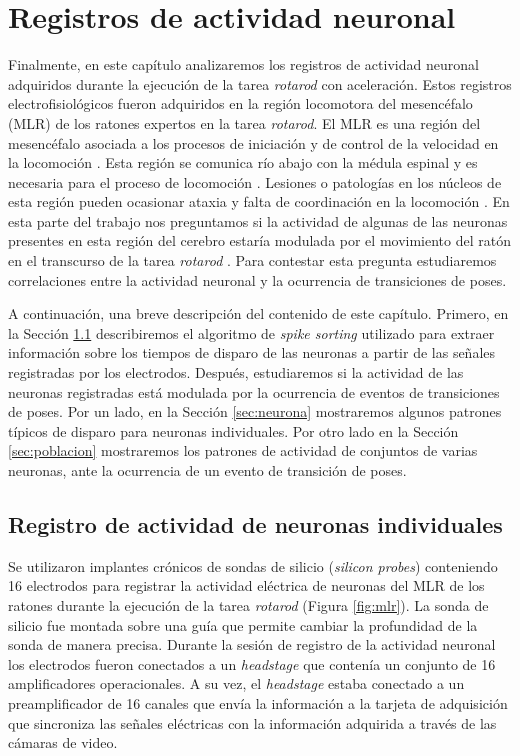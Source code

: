 \chapter{Registros de actividad neuronal}\label{cha:neuro}

Finalmente, en este capítulo analizaremos los registros de actividad neuronal adquiridos durante la ejecución de la tarea \textit{rotarod} con aceleración. Estos registros electrofisiológicos fueron adquiridos en la región locomotora del mesencéfalo (MLR) de los ratones expertos en la tarea \textit{rotarod}. El MLR es una región del mesencéfalo asociada a los procesos de iniciación y de control de la velocidad en la locomoción \cite{caggiano_midbrain, roseberry_locomotor, shik_walking}. Esta región se comunica río abajo con la médula espinal y es necesaria para el proceso de locomoción \cite{nielsen_mlr_walk, capaday_mlr_walk}. Lesiones o patologías en los núcleos de esta región pueden ocasionar ataxia y falta de coordinación en la locomoción \cite{hathout_ataxia}. En esta parte del trabajo nos preguntamos si la actividad de algunas de las neuronas presentes en esta región del cerebro estaría modulada por el movimiento del ratón en el transcurso de la tarea \textit{rotarod} \cite{skinner_mlr_rat, sherman_mlr_cat, leray_mlr_vertebrate}. Para contestar esta pregunta estudiaremos correlaciones entre la actividad neuronal y la ocurrencia de transiciones de poses.

A continuación, una breve descripción del contenido de este capítulo. Primero, en la Sección \ref{sec:sorting} describiremos el algoritmo de \textit{spike sorting} utilizado para extraer información sobre los tiempos de disparo de las neuronas a partir de las señales registradas por los electrodos. Después, estudiaremos si la actividad de las neuronas registradas está modulada por la ocurrencia de eventos de transiciones de poses. Por un lado, en la Sección \ref{sec:neurona} mostraremos algunos patrones típicos de disparo para neuronas individuales. Por otro lado en la Sección \ref{sec:poblacion} mostraremos los patrones de actividad de conjuntos de varias neuronas, ante la ocurrencia de un evento de transición de poses.

\section{Registro de actividad de neuronas individuales}\label{sec:sorting}

Se utilizaron implantes crónicos de sondas de silicio (\textit{silicon probes}) conteniendo 16 electrodos para registrar la actividad eléctrica de neuronas del MLR de los ratones durante la ejecución de la tarea \textit{rotarod} (Figura \ref{fig:mlr}). La sonda de silicio fue montada sobre una guía que permite cambiar la profundidad de la sonda de manera precisa. Durante la sesión de registro de la actividad neuronal los electrodos fueron conectados a un \textit{headstage} que  contenía un conjunto de 16 amplificadores operacionales. A su vez, el \textit{headstage} estaba conectado a un preamplificador de 16 canales \cite{esposito_defensive} que envía la información a la tarjeta de adquisición que sincroniza las señales eléctricas con la información adquirida a través de las cámaras de video.

